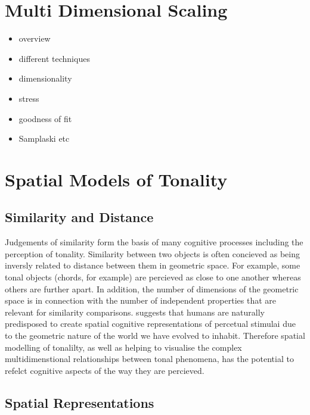 \documentclass{article}
\begin{document}
\section{Multi Dimensional Scaling}
\label{sec-4}

\begin{itemize}
\item overview
\item different techniques
\item dimensionality
\item stress
\item goodness of fit
\item Samplaski etc
\end{itemize}
\section{Spatial Models of Tonality}
\label{sec-5}
\subsection{Similarity and Distance}
\label{sec-5-1}

Judgements of similarity form the basis of many cognitive processes
including the perception of tonality. Similarity between two objects
is often concieved as being inversly related to distance between them
in geometric space. For example, some tonal objects (chords, for
example) are percieved as close to one another whereas others are
further apart. In addition, the number of dimensions of the geometric
space is in connection with the number of independent properties that
are relevant for similarity comparisons.\citep{Gardenfors1995}
suggests that humans are naturally predisposed to create spatial
cognitive representations of percetual stimulai due to the geometric
nature of the world we have evolved to inhabit. Therefore spatial
modelling of tonalilty, as well as helping to visualise the complex
multidimenstional relationships between tonal phenomena, has the
potential to refelct cognitive aspects of the way they are percieved.
\subsection{Spatial Representations}
\label{sec-5-2}
\end{document}

